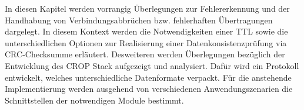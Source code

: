 \label{cap:konzept}

In diesen Kapitel werden vorrangig {\"U}berlegungen zur Fehlererkennung
und der Handhabung von Verbindungsabbr{\"u}chen bzw. fehlerhaften
{\"U}bertragungen dargelegt. In diesem Kontext werden die Notwendigkeiten einer
\gls{TTL} sowie die unterschiedlichen Optionen zur
Realisierung einer Datenkonsistenzpr{\"u}fung via CRC-Checksumme erl{\"a}utert. Desweiteren
werden {\"U}berlegungen bez{\"u}glich der Entwicklung des \gls{CROP} Stack
aufgezeigt und analysiert. Dafür wird ein Protokoll entwickelt, welches
unterschiedliche Datenformate verpackt. Für die
anstehende Implementierung werden ausgehend von verschiedenen Anwendungszenarien
die Schnittstellen der notwendigen Module bestimmt.